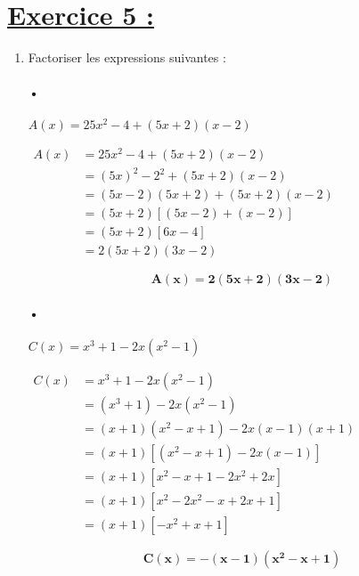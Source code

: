 \documentclass[12pt,a4paper]{article}
\begin{document}
\section*{\underline{Exercice 5 :}}
\begin{enumerate}
    \item Factoriser les expressions suivantes :
 
\paragraph{•}   
\( A(x) = 25x^2 - 4 + (5x + 2)(x - 2) \)

\(
\begin{aligned}
A(x) &= 25x^2 - 4 + (5x + 2)(x - 2) \\
     &= (5x)^2 - 2^2 + (5x + 2)(x - 2) \\
     &= (5x - 2)(5x + 2) + (5x + 2)(x - 2) \\
     &= (5x + 2)\left[(5x - 2) + (x - 2)\right] \\
     &= (5x + 2)\left[6x - 4\right] \\
     &= 2(5x + 2)(3x - 2)
\end{aligned}
\)

\begin{tcolorbox}[colback=yellow!20, colframe=black, sharp corners]
    \[
    \mathbf{A(x) = 2(5x + 2)(3x - 2)}
    \]
\end{tcolorbox}

\paragraph{•}
\(
C(x) = x^3 + 1 - 2x(x^2 - 1)
\)

\(
\begin{aligned}
C(x) &= x^3 + 1 - 2x(x^2 - 1) \\
     &= (x^3 + 1) - 2x(x^2 - 1)\\
     &=(x + 1)(x^2 - x + 1) - 2x(x - 1)(x + 1)\\
     &= (x + 1) \left[(x^2 - x + 1) - 2x(x - 1) \right]\\
     &= (x + 1) \left[x^2 - x + 1 - 2x^2 + 2x \right] \\
     &= (x + 1) \left[x^2 - 2x^2 - x + 2x + 1 \right] \\
     &= (x + 1) \left[-x^2 + x + 1 \right]
\end{aligned}
\)



\begin{tcolorbox}[colback=yellow!20, colframe=black, sharp corners]
    \[
    \mathbf{C(x) = -(x - 1)(x^2 - x + 1)}
    \]
\end{tcolorbox}


\end{enumerate}
\end{document}

